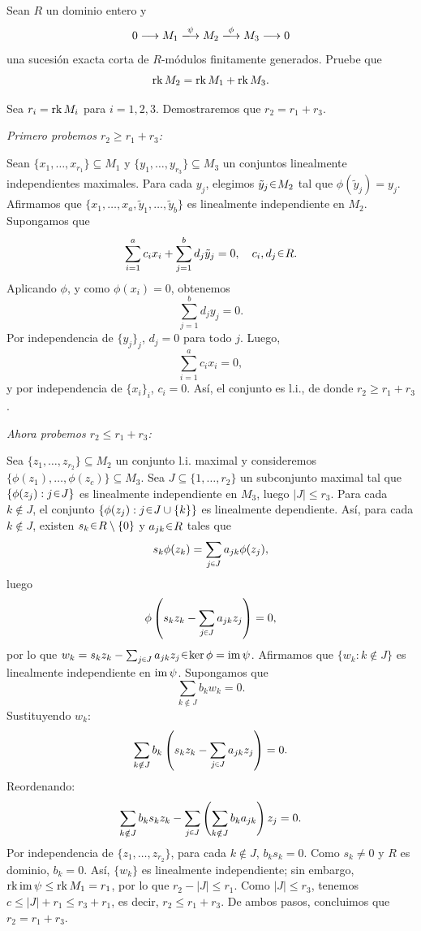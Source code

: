 \begin{ejer}
Sean $R$ un dominio entero y  
\[0 \longrightarrow M_1 \xlongrightarrow{\psi} M_2 \xlongrightarrow{\phi} M_3 \longrightarrow 0\]  
una sucesión exacta corta de $R$-módulos finitamente generados. Pruebe que  
\[\operatorname{rk} M_2 = \operatorname{rk} M_1 + \operatorname{rk} M_3.\]
\end{ejer}
\begin{sol}
Sea $r_i = \operatorname{rk} M_i$ para $i = 1, 2, 3 $. Demostraremos que $r_2 = r_1 + r_3 $.

\emph{Primero probemos $r_2 \geq r_1 + r_3 $:}

Sean $\{x_1, \dots, x_{r_1}\} \subseteq M_1$ y $\{y_1, \dots, y_{r_3}\} \subseteq M_3$ un conjuntos linealmente independientes maximales. Para cada $y_j $, elegimos $\tilde{y}_j \en M_2$ tal que $\phi(\tilde{y}_j) = y_j $.  
Afirmamos que $\{x_1, \dots, x_a, \tilde{y}_1, \dots, \tilde{y}_b\}$ es linealmente independiente en $M_2 $.  
Supongamos que 
\[
\sum_{i=1}^a c_i x_i + \sum_{j=1}^b d_j \tilde{y}_j = 0, \quad c_i, d_j \en R.
\]
Aplicando $\phi $, y como $\phi(x_i) = 0 $, obtenemos
\[
\sum_{j=1}^b d_j y_j = 0.
\]
Por independencia de $\{y_j\}_j $, $d_j = 0$ para todo $j $. Luego,
\[
\sum_{i=1}^a c_i x_i = 0,
\]
y por independencia de $\{x_i\}_i $, $c_i = 0 $. Así, el conjunto es l.i., de donde $r_2 \geq r_1 + r_3 $.

\emph{Ahora probemos $r_2 \leq r_1 + r_3 $:}

Sea $\{z_1, \dots, z_{r_2}\} \subseteq M_2$ un conjunto l.i. maximal y consideremos $\{\phi(z_1), \dots, \phi(z_c)\} \subseteq M_3 $. Sea $J \subseteq \{1, \dots, r_2\}$ un subconjunto maximal tal que $\{\phi(z_j) : j \en J\}$ es linealmente independiente en $M_3 $, luego $|J| \leq r_3 $.  
Para cada $k \notin J $, el conjunto $\{\phi(z_j) : j \en J \cup \{k\}\}$ es linealmente dependiente. Así, para cada $k \notin J $, existen $s_k \en R \setminus \{0\}$ y $a_{jk} \en R$ tales que
\[
s_k \phi(z_k) = \sum_{j \en J} a_{jk} \phi(z_j),
\]
luego
\[
\phi\left( s_k z_k - \sum_{j \en J} a_{jk} z_j \right) = 0,
\]
por lo que $w_k = s_k z_k - \sum_{j \en J} a_{jk} z_j \en \ker \phi = \im\psi $.  
Afirmamos que $\{w_k : k \notin J\}$ es linealmente independiente en $\operatorname{im}\psi$. Supongamos que
\[
\sum_{k \notin J} b_k w_k = 0.
\]
Sustituyendo $w_k $:
\[
\sum_{k \notin J} b_k \left( s_k z_k - \sum_{j \en J} a_{jk} z_j \right) = 0.
\]
Reordenando:
\[
\sum_{k \notin J} b_k s_k z_k - \sum_{j \en J} \left( \sum_{k \notin J} b_k a_{jk} \right) z_j = 0.
\]
Por independencia de $\{z_1, \dots, z_{r_2}\} $, para cada $k \notin J $, $b_k s_k = 0 $. Como $s_k \neq 0$ y $R$ es dominio, $b_k = 0 $. Así, $\{w_k\}$ es linealmente independiente; sin embargo, $\operatorname{rk}\operatorname{im}\psi \leq \operatorname{rk} M_1 = r_1$, por lo que $r_2 - |J| \leq r_1 $.  
Como $|J| \leq r_3 $, tenemos $c \leq |J| + r_1 \leq r_3 + r_1 $, es decir, $r_2 \leq r_1 + r_3 $. De ambos pasos, concluimos que $r_2 = r_1 + r_3 $.
\end{sol}

